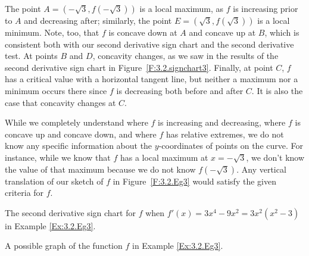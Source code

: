 \begin{example}
The point $A = (-\sqrt{3}, f(-\sqrt{3}))$ is a local maximum, as $f$ is increasing prior to $A$ and decreasing after; similarly, the point $E = (\sqrt{3}, f(\sqrt{3}))$ is a local minimum.  Note, too, that $f$ is concave down at $A$ and concave up at $B$, which is consistent both with our second derivative sign chart and the second derivative test.  At points $B$ and $D$, concavity changes, as we saw in the results of the second derivative sign chart in Figure~\ref{F:3.2.signchart3}.  Finally, at point $C$, $f$ has a critical value with a horizontal tangent line, but neither a maximum nor a minimum occurs there since $f$ is decreasing both before and after $C$.  It is also the case that concavity changes at $C$.

While we completely understand where $f$ is increasing and decreasing, where $f$ is concave up and concave down, and where $f$ has relative extremes, we do not know any specific information about the $y$-coordinates of points on the curve.  For instance, while we know that $f$ has a local maximum at $x = -\sqrt{3}$, we don't know the value of that maximum because we do not know $f(-\sqrt{3})$.  Any vertical translation of our sketch of $f$ in Figure~\ref{F:3.2.Eg3} would satisfy the given criteria for $f$.
\end{example}

\begin{marginfigure}[-18cm]
\caption{The second derivative sign chart for $f$ when $f'(x) = 3x^4 - 9x^2 = 3x^2(x^2-3)$ in Example \ref{Ex:3.2.Eg3}.}
\label{F:3.2.signchart3}
\end{marginfigure}

\begin{marginfigure}[-7cm]
\caption{A possible graph of the function $f$ in Example \ref{Ex:3.2.Eg3}.}
\label{F:3.2.Eg3}
\end{marginfigure}